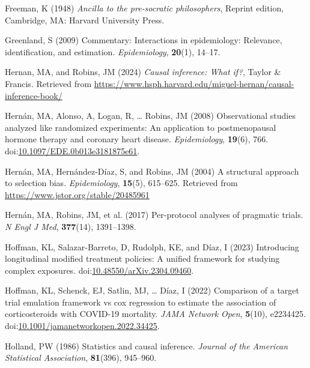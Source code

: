 \documentclass[
  single column]{article}
\newlength{\cslhangindent}
\newenvironment{CSLReferences}[2] %
 {\begin{list}{}{%
  \setlength{\itemindent}{0pt}
  \setlength{\leftmargin}{0pt}
  \setlength{\parsep}{0pt}
  \ifodd #1
   \setlength{\leftmargin}{\cslhangindent}
   \setlength{\itemindent}{-1\cslhangindent}
  \fi
  \setlength{\itemsep}{#2\baselineskip}}}
 {\end{list}}
\begin{document}
\begin{CSLReferences}{1}{0}
Freeman, K (1948) \emph{Ancilla to the pre-socratic philosophers},
Reprint edition, Cambridge, MA: Harvard University Press.

Greenland, S (2009) Commentary: Interactions in epidemiology: Relevance,
identification, and estimation. \emph{Epidemiology}, \textbf{20}(1),
14--17.

Hernan, MA, and Robins, JM (2024) \emph{Causal inference: What if?},
Taylor \& Francis. Retrieved from
\url{https://www.hsph.harvard.edu/miguel-hernan/causal-inference-book/}

Hernán, MA, Alonso, A, Logan, R, \ldots{} Robins, JM (2008)
Observational studies analyzed like randomized experiments: An
application to postmenopausal hormone therapy and coronary heart
disease. \emph{Epidemiology}, \textbf{19}(6), 766.
doi:\href{https://doi.org/10.1097/EDE.0b013e3181875e61}{10.1097/EDE.0b013e3181875e61}.

Hernán, MA, Hernández-Díaz, S, and Robins, JM (2004) A structural
approach to selection bias. \emph{Epidemiology}, \textbf{15}(5),
615--625. Retrieved from \url{https://www.jstor.org/stable/20485961}

Hernán, MA, Robins, JM, et al. (2017) Per-protocol analyses of pragmatic
trials. \emph{N Engl J Med}, \textbf{377}(14), 1391--1398.

Hoffman, KL, Salazar-Barreto, D, Rudolph, KE, and Díaz, I (2023)
Introducing longitudinal modified treatment policies: A unified
framework for studying complex exposures.
doi:\href{https://doi.org/10.48550/arXiv.2304.09460}{10.48550/arXiv.2304.09460}.

Hoffman, KL, Schenck, EJ, Satlin, MJ, \ldots{} Díaz, I (2022) Comparison
of a target trial emulation framework vs cox regression to estimate the
association of corticosteroids with COVID-19 mortality. \emph{JAMA
Network Open}, \textbf{5}(10), e2234425.
doi:\href{https://doi.org/10.1001/jamanetworkopen.2022.34425}{10.1001/jamanetworkopen.2022.34425}.

Holland, PW (1986) Statistics and causal inference. \emph{Journal of the
American Statistical Association}, \textbf{81}(396), 945--960.


\end{CSLReferences}
\end{document}
